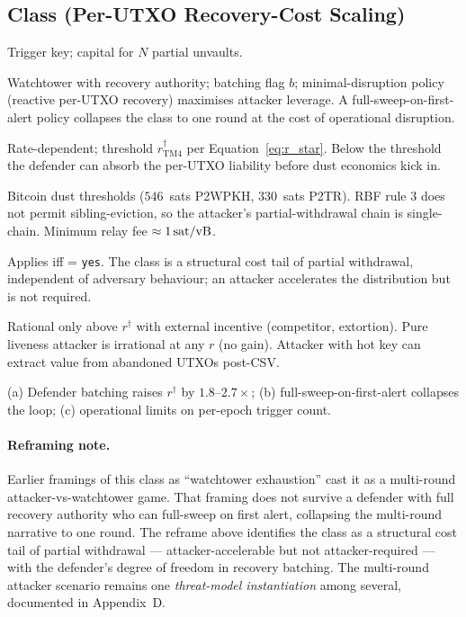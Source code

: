 \subsection{Class \classscale{} (Per-UTXO Recovery-Cost Scaling)}
\label{ss:rat_classscale}
\begin{description}[leftmargin=1.5em,itemsep=1pt,parsep=0pt]
\item[(1) Attacker capability.] Trigger key; capital for $N$ partial
  unvaults.
\item[(2) Defender model.] Watchtower with recovery authority;
  batching flag $b$; minimal-disruption policy (reactive per-UTXO
  recovery) maximises attacker leverage. A full-sweep-on-first-alert
  policy collapses the class to one round at the cost of operational
  disruption.
\item[(3) Economic preconditions.] Rate-dependent; threshold
  $r^\dagger_{\mathrm{TM4}}$ per Equation~\ref{eq:r_star}. Below
  the threshold the defender can absorb the per-UTXO liability
  before dust economics kick in.
\item[(4) Protocol / network assumptions.] Bitcoin dust thresholds
  ($546$~sats P2WPKH, $330$~sats P2TR). RBF rule 3 does not permit
  sibling-eviction, so the attacker's partial-withdrawal chain is
  single-chain. Minimum relay fee $\approx 1\,\text{sat/vB}{}$.
\item[(5) Scope of validity.] Applies iff \axrevault{} =
  \texttt{yes}. The class is a structural cost tail of partial
  withdrawal, independent of adversary behaviour; an attacker
  accelerates the distribution but is not required.
\item[(6) Rational-attacker check.] Rational only above $r^\dagger$
  with external incentive (competitor, extortion). Pure liveness
  attacker is irrational at any $r$ (no gain). Attacker with hot
  key can extract value from abandoned UTXOs post-CSV.
\item[(7) Counter-factual mitigations.] (a) Defender batching raises
  $r^\dagger$ by $1.8$--$2.7\times$; (b) full-sweep-on-first-alert
  collapses the loop; (c) operational limits on per-epoch trigger
  count.
\end{description}

\paragraph{Reframing note.}
Earlier framings of this class as ``watchtower exhaustion'' cast it
as a multi-round attacker-vs-watchtower game. That framing does not
survive a defender with full recovery authority who can full-sweep
on first alert, collapsing the multi-round narrative to one round.
The reframe above identifies the class as a structural cost tail of
partial withdrawal --- attacker-accelerable but not
attacker-required --- with the defender's degree of freedom in
recovery batching. The multi-round attacker scenario remains one
\emph{threat-model instantiation} among several, documented in
Appendix~D.

